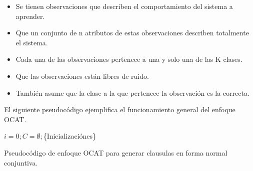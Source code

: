 \begin{itemize}
	\item Se tienen observaciones que describen el comportamiento del sistema a aprender.
	\item Que un conjunto de n atributos de estas observaciones describen totalmente el sistema.
	\item Cada una de las observaciones pertenece a una y solo una de las K clases.
	\item Que las observaciones están libres de ruido.
	\item También asume que la clase a la que pertenece la observación es la correcta. 
\end{itemize}
\newpage
El siguiente pseudocódigo ejemplifica el funcionamiento general del enfoque OCAT.
\\
\begin{algorithm}[H] 
	
	\SetAlgoLined
	$i = 0; C=\emptyset;$\{Inicializaciónes\}\;
	
	\caption{Pseudocódigo de enfoque OCAT para generar clausulas en forma normal conjuntiva.}
\end{algorithm}

